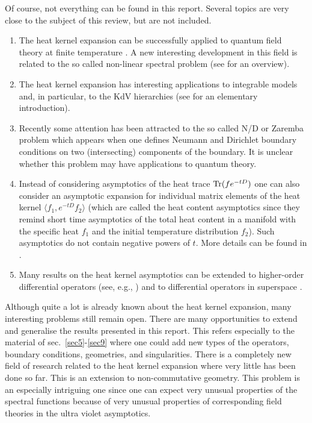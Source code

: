 Of course, not everything can be found in this report.
Several topics are very close to the subject of this review,
but are not included.
\begin{enumerate}
\item
The heat kernel expansion can be successfully applied to quantum field
theory at finite temperature \cite{Dowker:1978md}. A new interesting
development in this field is related to the so called non-linear
spectral problem \cite{Fursaev:2002vi} (see \cite{Fursaev:2001yu}
for an overview).
\item
The heat kernel expansion has interesting applications to
integrable models and, in particular, to the
KdV hierarchies (see \cite{Das:1989fn} for an elementary introduction).
\item
Recently some attention has been attracted 
\cite{Dowker:2000bi,Dowker:2000vm,Seeley:2001,Avramidi:2001aj}
to the so called N/D or Zaremba problem which appears when one
defines Neumann and Dirichlet boundary conditions on two
(intersecting) components of the boundary. It is unclear whether
this problem may have applications to quantum theory.
\item
Instead of considering asymptotics of the heat trace ${\rm Tr} (fe^{-tD})$
one can also consider an asymptotic expansion for individual matrix
elements of the heat kernel $\langle f_1, e^{-tD} f_2 \rangle$ (which are
called the heat content asymptotics since they remind short time
asymptotics of the total heat content in a manifold with the specific heat
$f_1$ and the initial temperature distribution $f_2$). Such asymptotics do
not contain negative powers of $t$. More details can be found in
\cite{Kirsten:2001wz}.
\item
Many results on the heat kernel asymptotics can be extended
to higher-order differential operators (see, e.g., 
\cite{Gilkey:1980,Gusynin:1990zt}) and to differential operators
in superspace \cite{Buchbinder:1986im}.
\end{enumerate}

Although quite a lot is already known about the heat kernel expansion,
many interesting problems still remain open. There are many 
opportunities to extend and generalise the results presented in this
report. This refers especially to the material of sec.\ 
\ref{sec5}-\ref{sec9} where one could add new types of the operators,
boundary conditions, geometries, and singularities. 
There is a completely new field of research related to the
heat kernel expansion where very little has been done so far.
This is 
an extension to non-commutative geometry. This  problem
is an especially intriguing one since one can expect very unusual
properties of the spectral functions because of very unusual properties
of corresponding field theories in the ultra violet asymptotics.


